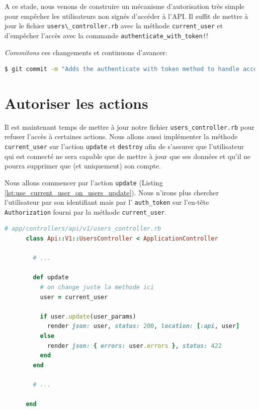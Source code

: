 \documentclass[]{report}
\begin{document}
    A ce stade, nous venons de construire un mécanisme d'autorisation très simple pour empêcher les utilisateurs non signés d'accéder à l'API. Il suffit de mettre à jour le fichier \verb|users\_controller.rb| avec la méthode \verb|current_user| et d'empêcher l'accès avec la commande \verb|authenticate_with_token!|!

    \textit{Commitons} ces changements et continuons d'avancer:

    \begin{scriptsize}
      \begin{lstlisting}[language=bash]
      $ git commit -m "Adds the authenticate with token method to handle access to actions"
      \end{lstlisting}
    \end{scriptsize}

  \section{Autoriser les actions}

    Il est maintenant temps de mettre à jour notre fichier \verb|users_controller.rb| pour refuser l'accès à certaines actions. Nous allons aussi implémenter la méthode \verb|current_user| sur l'action \verb|update| et \verb|destroy| afin de s'assurer que l'utilisateur qui est connecté ne sera capable que de mettre à jour que ses données et qu'il ne pourra supprimer que (et uniquement) son compte.

    Nous allons commencer par l'action \verb|update| (Listing \ref{lst:use_current_user_on_users_update}). Nous n'irons plus chercher l'utilisateur par son identifiant mais par l' \verb|auth_token| sur l'en-tête \verb|Authorization| fourni par la méthode \verb|current_user|.

    \begin{scriptsize}
      \begin{lstlisting}[language=ruby, label={lst:use_current_user_on_users_update}, caption={Utilisation de la méthode current\_user pour l'action update}]
      # app/controllers/api/v1/users_controller.rb
      class Api::V1::UsersController < ApplicationController

        # ...

        def update
          # on change juste la methode ici
          user = current_user

          if user.update(user_params)
            render json: user, status: 200, location: [:api, user]
          else
            render json: { errors: user.errors }, status: 422
          end
        end

        # ...

      end
      \end{lstlisting}
    \end{scriptsize}
\end{document}
